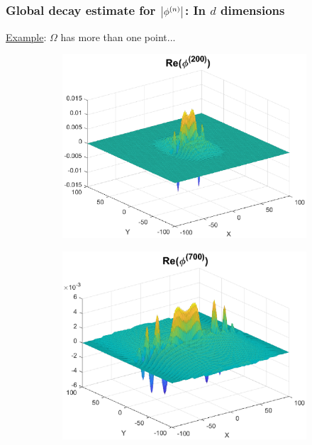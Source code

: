 \documentclass{beamer}
\theoremstyle{definition}
\begin{document}
\begin{frame}
\frametitle{Global decay estimate for $\abs{\phi^{(n)}}$: In $d$ dimensions}
\underline{Example}: $\Omega$ has more than one point...


\begin{figure}
\begin{subfigure}{0.495\textwidth}
	\centering
	\includegraphics[width=\textwidth]{Fig10a.eps}
\end{subfigure}
\begin{subfigure}{0.495\textwidth}
	\centering
	\includegraphics[width=\textwidth]{Fig10b.eps}
\end{subfigure}
\end{figure}

\end{frame}
\end{document}
